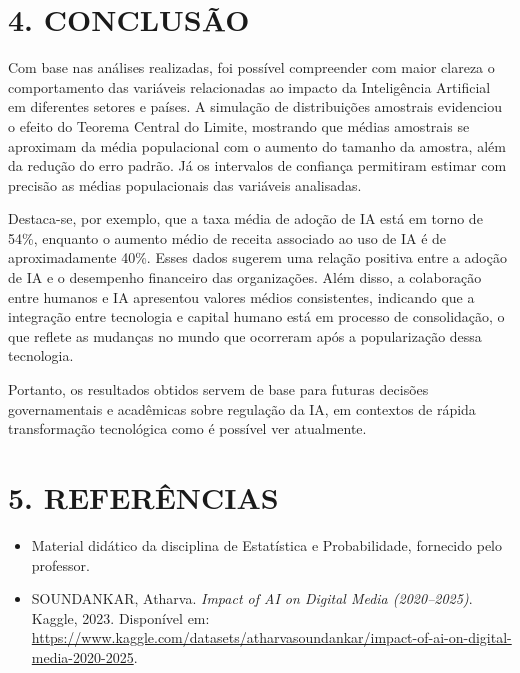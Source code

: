 \documentclass[12pt]{article}
\begin{document}
\section*{4. CONCLUSÃO}

Com base nas análises realizadas, foi possível compreender com maior clareza o comportamento das variáveis relacionadas ao impacto da Inteligência Artificial em diferentes setores e países. A simulação de distribuições amostrais evidenciou o efeito do Teorema Central do Limite, mostrando que médias amostrais se aproximam da média populacional com o aumento do tamanho da amostra, além da redução do erro padrão. Já os intervalos de confiança permitiram estimar com precisão as médias populacionais das variáveis analisadas.

Destaca-se, por exemplo, que a taxa média de adoção de IA está em torno de 54\%, enquanto o aumento médio de receita associado ao uso de IA é de aproximadamente 40\%. Esses dados sugerem uma relação positiva entre a adoção de IA e o desempenho financeiro das organizações. Além disso, a colaboração entre humanos e IA apresentou valores médios consistentes, indicando que a integração entre tecnologia e capital humano está em processo de consolidação, o que reflete as mudanças no mundo que ocorreram após a popularização dessa tecnologia.

Portanto, os resultados obtidos servem de base para futuras decisões governamentais e acadêmicas sobre regulação da IA, em contextos de rápida transformação tecnológica como é possível ver atualmente.

\section*{5. REFERÊNCIAS}

\begin{itemize}
    \item Material didático da disciplina de Estatística e Probabilidade, fornecido pelo professor.
    \item SOUNDANKAR, Atharva. \textit{Impact of AI on Digital Media (2020–2025)}. Kaggle, 2023. Disponível em: \url{https://www.kaggle.com/datasets/atharvasoundankar/impact-of-ai-on-digital-media-2020-2025}.
\end{itemize}
\end{document}
